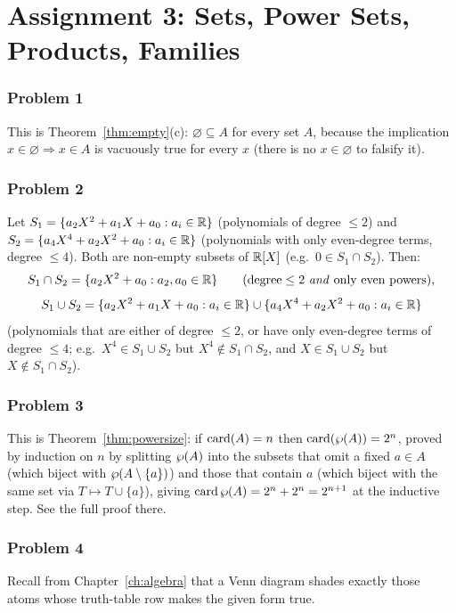 \chapter{Assignment 3: Sets, Power Sets, Products, Families}\label{ch:sol3}

\subsection*{Problem 1}
This is Theorem~\ref{thm:empty}(c): $\varnothing\subseteq A$ for every set $A$, because the implication $x\in\varnothing\Rightarrow x\in A$ is vacuously true for every $x$ (there is no $x\in\varnothing$ to falsify it).

\subsection*{Problem 2}
Let $S_1=\{a_2X^2+a_1X+a_0:a_i\in\mathbb{R}\}$ (polynomials of degree $\le2$) and $S_2=\{a_4X^4+a_2X^2+a_0:a_i\in\mathbb{R}\}$ (polynomials with only even-degree terms, degree $\le4$). Both are non-empty subsets of $\mathbb{R}[X]$ (e.g.\ $0\in S_1\cap S_2$). Then:
\[
S_1\cap S_2=\{a_2X^2+a_0:a_2,a_0\in\mathbb{R}\}\qquad(\text{degree}\le2\text{ \emph{and} only even powers}),
\]
\[
S_1\cup S_2=\{a_2X^2+a_1X+a_0:a_i\in\mathbb{R}\}\cup\{a_4X^4+a_2X^2+a_0:a_i\in\mathbb{R}\}
\]
(polynomials that are either of degree $\le2$, or have only even-degree terms of degree $\le4$; e.g.\ $X^4\in S_1\cup S_2$ but $X^4\notin S_1\cap S_2$, and $X\in S_1\cup S_2$ but $X\notin S_1\cap S_2$).

\subsection*{Problem 3}
This is Theorem~\ref{thm:powersize}: if $\operatorname{card}(A)=n$ then $\operatorname{card}(\wp(A))=2^n$, proved by induction on $n$ by splitting $\wp(A)$ into the subsets that omit a fixed $a\in A$ (which biject with $\wp(A\setminus\{a\})$) and those that contain $a$ (which biject with the same set via $T\mapsto T\cup\{a\}$), giving $\operatorname{card}\wp(A)=2^n+2^n=2^{n+1}$ at the inductive step. See the full proof there.

\subsection*{Problem 4}
Recall from Chapter~\ref{ch:algebra} that a Venn diagram shades exactly those atoms whose truth-table row makes the given form true.

